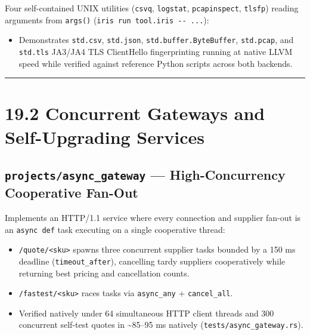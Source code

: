 \documentclass[
  english,
  oneside]{book}
\providecommand{\tightlist}{%
  \setlength{\itemsep}{0pt}\setlength{\parskip}{0pt}}
\begin{document}
Four self-contained UNIX utilities (\texttt{csvq}, \texttt{logstat},
\texttt{pcapinspect}, \texttt{tlsfp}) reading arguments from
\texttt{args()} (\texttt{iris\ run\ tool.iris\ -\/-\ ...}):

\begin{itemize}
\tightlist
\item
  Demonstrates \texttt{std.csv}, \texttt{std.json},
  \texttt{std.buffer.ByteBuffer}, \texttt{std.pcap}, and
  \texttt{std.tls} JA3/JA4 TLS ClientHello fingerprinting running at
  native LLVM speed while verified against reference Python scripts
  across both backends.
\end{itemize}

\begin{center}\rule{0.5\linewidth}{0.5pt}\end{center}

\section{19.2 Concurrent Gateways and Self-Upgrading
Services}\label{concurrent-gateways-and-self-upgrading-services}

\subsection{\texorpdfstring{\texttt{projects/async\_gateway} ---
High-Concurrency Cooperative
Fan-Out}{projects/async\_gateway --- High-Concurrency Cooperative Fan-Out}}\label{projectsasync_gateway-high-concurrency-cooperative-fan-out}

Implements an HTTP/1.1 service where every connection and supplier
fan-out is an \texttt{async\ def} task executing on a single cooperative
thread:

\begin{itemize}
\tightlist
\item
  \texttt{/quote/\textless{}sku\textgreater{}} spawns three concurrent
  supplier tasks bounded by a 150 ms deadline (\texttt{timeout\_after}),
  cancelling tardy suppliers cooperatively while returning best pricing
  and cancellation counts.
\item
  \texttt{/fastest/\textless{}sku\textgreater{}} races tasks via
  \texttt{async\_any} + \texttt{cancel\_all}.
\item
  Verified natively under 64 simultaneous HTTP client threads and 300
  concurrent self-test quotes in \textasciitilde85--95 ms natively
  (\texttt{tests/async\_gateway.rs}).
\end{itemize}
\end{document}
